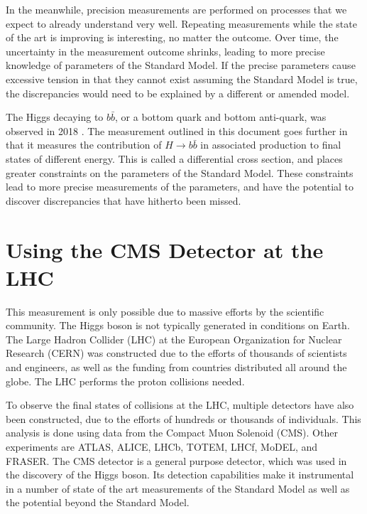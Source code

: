 In the meanwhile, precision measurements are performed on
processes that we expect to already understand very well.
Repeating measurements while the state of the art is improving is interesting,
no matter the outcome.
Over time, the uncertainty in the measurement outcome shrinks,
leading to more precise knowledge of parameters of the Standard Model.
If the precise parameters cause excessive tension in that they cannot exist
assuming the Standard Model is true,
the discrepancies would need to be explained by a different or amended model.

The Higgs decaying to $b\bar{b}$, or a bottom quark and bottom anti-quark,
was observed in 2018 \cite{obs-18, Aaboud_2018}.
The measurement outlined in this document goes further in that
it measures the contribution of $H \rightarrow b\bar{b}$ in associated production
to final states of different energy.
This is called a differential cross section,
and places greater constraints on the parameters of the Standard Model.
These constraints lead to more precise measurements of the parameters,
and have the potential to discover discrepancies that have hitherto been missed.

\section{Using the CMS Detector at the LHC}

This measurement is only possible due to massive efforts by the scientific community.
The Higgs boson is not typically generated in conditions on Earth.
The Large Hadron Collider (LHC) at the European Organization for Nuclear Research (CERN)
was constructed due to the efforts of thousands of scientists and engineers,
as well as the funding from countries distributed all around the globe.
The LHC performs the proton collisions needed.

To observe the final states of collisions at the LHC,
multiple detectors have also been constructed,
due to the efforts of hundreds or thousands of individuals.
This analysis is done using data from the Compact Muon Solenoid (CMS).
Other experiments are ATLAS, ALICE, LHCb, TOTEM, LHCf, MoDEL, and FRASER.
The CMS detector is a general purpose detector,
which was used in the discovery of the Higgs boson.
Its detection capabilities make it instrumental in a number of state of the art
measurements of the Standard Model as well as the potential beyond the Standard Model.
